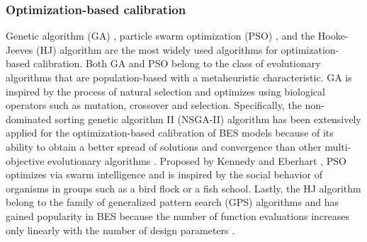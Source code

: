 \documentclass[review]{elsarticle}
\begin{document}
\subsubsection{Optimization-based calibration}

Genetic algorithm (GA) \cite{bandera2017towards, ramosruiz2017analysis, ramosruiz2016genetic, zuhaib2019application, martinez2020performance, martinez2020model, nagpal2019framework, tian2019investigation, chen2019meta}, particle swarm optimization (PSO) \cite{andrade-cabrera2017ensemble, yang2016automated, roberti2015calibrating, andrade-cabrera2019augmented, zhang2020development, Ha2020parameter, larochellemartin2019energy, ferrara2020optimizing, cacabelos2017development}, and the Hooke-Jeeves (HJ) algorithm \cite{li2018stepwise, abdelalim2017data, ogando2017energy, carlon2016on, cacabelos2017development} are the most widely used algorithms for optimization-based calibration. Both GA and PSO belong to the class of evolutionary algorithms that are population-based with a metaheuristic characteristic. GA is inspired by the process of natural selection and optimizes using biological operators such as mutation, crossover and selection. Specifically, the non-dominated sorting genetic algorithm II (NSGA-II) algorithm has been extensively applied for the optimization-based calibration of BES models \cite{bandera2017towards, ramosruiz2017analysis, ramosruiz2016genetic, zuhaib2019application, martinez2020performance, martinez2020model} because of its ability to obtain a better spread of solutions and convergence than other multi-objective evolutionary algorithms \cite{deb2002fast}. Proposed by Kennedy and Eberhart \cite{kennedy1995particle}, PSO optimizes via swarm intelligence and is inspired by the social behavior of organisms in groups such as a bird flock or a fish school. Lastly, the HJ algorithm \cite{hooke1961direct} belong to the family of generalized pattern search (GPS) algorithms and has gained popularity in BES because the number of function evaluations increases only linearly with the number of design parameters \cite{wetter2001genopt}.
\end{document}
